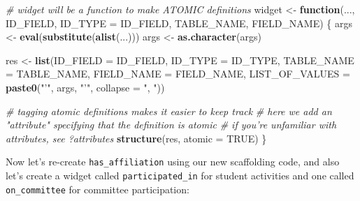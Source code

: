 \documentclass[]{book}
\newenvironment{Shaded}{\begin{snugshade}}{\end{snugshade}}
\newcommand{\CommentTok}[1]{\textcolor[rgb]{0.56,0.35,0.01}{\textit{#1}}}
\newcommand{\ControlFlowTok}[1]{\textcolor[rgb]{0.13,0.29,0.53}{\textbf{#1}}}
\newcommand{\DataTypeTok}[1]{\textcolor[rgb]{0.13,0.29,0.53}{#1}}
\newcommand{\KeywordTok}[1]{\textcolor[rgb]{0.13,0.29,0.53}{\textbf{#1}}}
\newcommand{\NormalTok}[1]{#1}
\newcommand{\OtherTok}[1]{\textcolor[rgb]{0.56,0.35,0.01}{#1}}
\newcommand{\StringTok}[1]{\textcolor[rgb]{0.31,0.60,0.02}{#1}}
\begin{document}
\begin{Shaded}
\begin{Highlighting}[]
\CommentTok{# widget will be a function to make ATOMIC definitions}
\NormalTok{widget <-}\StringTok{ }\ControlFlowTok{function}\NormalTok{(..., ID_FIELD, }\DataTypeTok{ID_TYPE =}\NormalTok{ ID_FIELD, TABLE_NAME,}
\NormalTok{                   FIELD_NAME) \{}
\NormalTok{    args <-}\StringTok{ }\KeywordTok{eval}\NormalTok{(}\KeywordTok{substitute}\NormalTok{(}\KeywordTok{alist}\NormalTok{(...)))}
\NormalTok{    args <-}\StringTok{ }\KeywordTok{as.character}\NormalTok{(args)}
    
\NormalTok{    res <-}\StringTok{ }\KeywordTok{list}\NormalTok{(}\DataTypeTok{ID_FIELD =}\NormalTok{ ID_FIELD,}
                \DataTypeTok{ID_TYPE =}\NormalTok{ ID_TYPE,}
                \DataTypeTok{TABLE_NAME =}\NormalTok{ TABLE_NAME,}
                \DataTypeTok{FIELD_NAME =}\NormalTok{ FIELD_NAME,}
                \DataTypeTok{LIST_OF_VALUES =} \KeywordTok{paste0}\NormalTok{(}\StringTok{"'"}\NormalTok{, args, }\StringTok{"'"}\NormalTok{,}
                                        \DataTypeTok{collapse =} \StringTok{", "}\NormalTok{))}
    
    \CommentTok{# tagging atomic definitions makes it easier to keep track}
    \CommentTok{# here we add an "attribute" specifying that the definition is atomic}
    \CommentTok{# if you're unfamiliar with attributes, see ?attributes}
    \KeywordTok{structure}\NormalTok{(res, }\DataTypeTok{atomic =} \OtherTok{TRUE}\NormalTok{)}
\NormalTok{\}}
\end{Highlighting}
\end{Shaded}

Now let's re-create \texttt{has\_affiliation} using our new scaffolding code, and also let's create a widget called \texttt{participated\_in} for student activities and one called \texttt{on\_committee} for committee participation:
\end{document}
